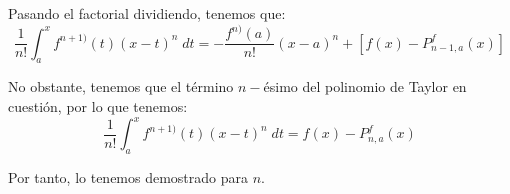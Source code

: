 \documentclass[12pt]{article}
\begin{document}
\begin{ejercicio}
\begin{itemize}
        Pasando el factorial dividiendo, tenemos que:
        \begin{equation*}
            \frac{1}{n!}\int_a^x f^{n+1)}(t) (x-t)^n\;dt
            =
            -\frac{f^{n)}(a)}{n!}(x-a)^n +\left[f(x)-P_{n-1, a}^f (x)\right]
        \end{equation*}

        No obstante, tenemos que el término $n-$ésimo del polinomio de Taylor en cuestión, por lo que tenemos:
        \begin{equation*}
            \frac{1}{n!}\int_a^x f^{n+1)}(t) (x-t)^n\;dt
            =
            f(x)-P_{n, a}^f (x)
        \end{equation*}

        Por tanto, lo tenemos demostrado para $n$.
    \end{itemize}
\end{ejercicio}
    
\end{document}
